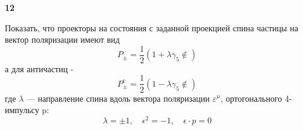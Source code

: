 \documentclass[a4paper,12pt]{article} %
\begin{document}
\begin{ttask} \textbf{12} 

Показать, что проекторы на состояния с заданной проекцией
спина частицы на вектор поляризации имеют вид
$$
P_{\pm}=\frac{1}{2}\left(1+\lambda \gamma_{5} \notin\right)
$$
а для античастиц -
$$
P_{\pm}^{c}=\frac{1}{2}\left(1-\lambda \gamma_{5} \notin\right)
$$
где $\lambda$ — направление спина вдоль вектора поляризации $\varepsilon^\mu$, ортогонального 4-импульсу p:
$$
\lambda=\pm 1, \quad \epsilon^{2}=-1, \quad \epsilon \cdot p=0
$$









\end{ttask}
\end{document}
